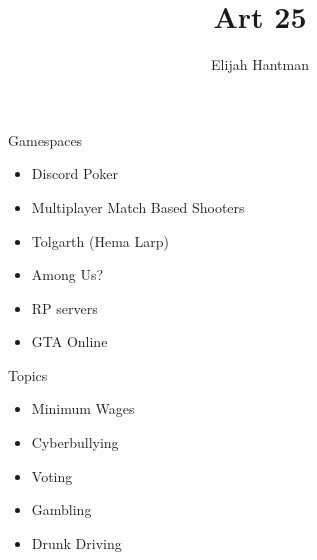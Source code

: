 \documentclass{report}
\title{\Huge{Art 25}}
\author{\huge{Elijah Hantman}}
\date{}
\begin{document}
\maketitle
\newpage

{\large Gamespaces}
\begin{itemize}
    \item Discord Poker
    \item Multiplayer Match Based Shooters
    \item Tolgarth (Hema Larp)
    \item Among Us?
    \item RP servers
    \item GTA Online
\end{itemize}

{\large Topics}
\begin{itemize}
    \item Minimum Wages
    \item Cyberbullying
    \item Voting
    \item Gambling
    \item Drunk Driving
\end{itemize}

\pagebreak
\end{document}
